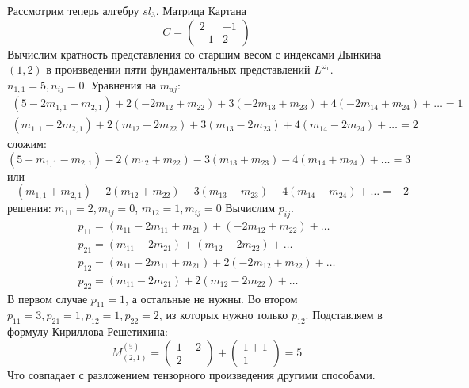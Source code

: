 \documentclass[12pt]{iopart}
\begin{document}
Рассмотрим теперь алгебру $sl_{3}$. Матрица Картана
\begin{equation}
  \label{eq:11}
  C=\left(\begin{array}{cc}
      2 & -1\\
      -1 & 2
    \end{array}\right)
\end{equation}
Вычислим кратность представления со старшим весом с индексами Дынкина $(1,2)$ в произведении пяти
фундаментальных представлений $L^{\omega_{1}}$. $n_{1,1}=5, n_{ij}=0$. Уравнения на $m_{aj}$:
\begin{eqnarray}
  \label{eq:12}
  (5-2m_{1,1}+m_{2,1})+2(-2m_{12}+m_{22})+3(-2m_{13}+m_{23})+4(-2m_{14}+m_{24})+\dots=1\\
  (m_{1,1}-2m_{2,1})+2(m_{12}-2m_{22})+3(m_{13}-2m_{23})+4(m_{14}-2m_{24})+\dots=2
\end{eqnarray}
сложим:
\begin{equation}
  \label{eq:13}
  (5-m_{1,1}-m_{2,1})-2(m_{12}+m_{22})-3(m_{13}+m_{23})-4(m_{14}+m_{24})+\dots=3
\end{equation}
или
\begin{equation}
  \label{eq:14}
    -(m_{1,1}+m_{2,1})-2(m_{12}+m_{22})-3(m_{13}+m_{23})-4(m_{14}+m_{24})+\dots=-2
\end{equation}
решения:
$m_{11}=2, m_{ij}=0$, $m_{12}=1, m_{ij}=0$
Вычислим $p_{ij}$. 
\begin{eqnarray}
  \label{eq:15}
  p_{11}=(n_{11}-2m_{11}+m_{21})+(-2m_{12}+m_{22})+\dots\\
  p_{21}=(m_{11}-2m_{21})+(m_{12}-2m_{22})+\dots\\
  p_{12}=(n_{11}-2m_{11}+m_{21})+2(-2m_{12}+m_{22})+\dots\\
  p_{22}=(m_{11}-2m_{21})+2(m_{12}-2m_{22})+\dots
\end{eqnarray}
В первом случае $p_{11}=1$, а остальные не нужны. Во втором $p_{11}=3, p_{21}=1, p_{12}=1,
p_{22}=2$, из которых нужно только $p_{12}$. Подставляем в формулу Кириллова-Решетихина:
\begin{equation}
  \label{eq:16}
    M_{(2,1)}^{(5)}=\left(
    \begin{array}{c}
      1+2\\
      2
    \end{array}\right)+
\left(\begin{array}{c}
      1+1\\
      1
    \end{array}\right)=5
\end{equation}
Что совпадает с разложением тензорного произведения другими способами. 
\end{document}
